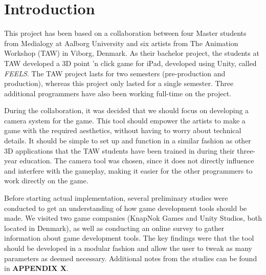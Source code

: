\section{Introduction}


This project has been based on a collaboration between four Master students from Medialogy at Aalborg University and six artists from The Animation Workshop (TAW) in Viborg, Denmark. As their bachelor project, the students at TAW developed a 3D point 'n click game for iPad, developed using Unity, called \textit{FEELS}. The TAW project lasts for two semesters (pre-production and production), whereas this project only lasted for a single semester. Three additional programmers have also been working full-time on the project.

During the collaboration, it was decided that we should focus on developing a camera system for the game. This tool should empower the artists to make a game with the required aesthetics, without having to worry about technical details. It should be simple to set up and function in a similar fashion as other 3D applications that the TAW students have been trained in during their three-year education. The camera tool was chosen, since it does not directly influence and interfere with the gameplay, making it easier for the other programmers to work directly on the game.

Before starting actual implementation, several preliminary studies were conducted to get an understanding of how game development tools should be made. We visited two game companies (KnapNok Games and Unity Studios, both located in Denmark), as well as conducting an online survey to gather information about game development tools. The key findings were that the tool should be developed in a modular fashion and allow the user to tweak as many parameters as deemed necessary. Additional notes from the studies can be found in \textbf{APPENDIX X}.